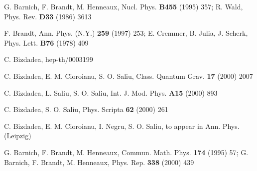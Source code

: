 \documentclass[a4paper,12pt]{article}
\begin{document}
\begin{thebibliography}{99}
  G. Barnich, F. Brandt,
M. Henneaux, Nucl. Phys. \textbf{B455}
(1995) 357; R. Wald, Phys. Rev.
\textbf{D33} (1986) 3613

  F. Brandt, Ann. Phys.
(N.Y.) \textbf{259} (1997) 253; E.
Cremmer, B. Julia, J. Scherk, Phys.
Lett. \textbf{B76} (1978) 409

  C. Bizdadea, hep-th/0003199

  C. Bizdadea, E. M. Cioroianu,
S. O. Saliu, Class. Quantum
Grav. \textbf{17} (2000) 2007

  C. Bizdadea, L. Saliu,
S. O. Saliu, Int. J. Mod. Phys. \textbf{%
A15} (2000) 893

  C. Bizdadea, S. O. Saliu,
Phys. Scripta \textbf{62} (2000) 261

  C. Bizdadea, E. M. Cioroianu,
I. Negru, S. O. Saliu, to
appear in Ann. Phys. (Leipzig)

  G. Barnich, F. Brandt, M.
Henneaux, Commun. Math. Phys.
\textbf{174} (1995) 57; G. Barnich, F.
Brandt, M. Henneaux, Phys. Rep.
\textbf{338} (2000) 439
\end{thebibliography}
\end{document}
